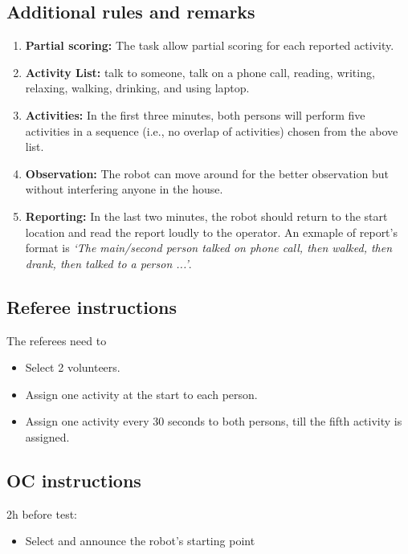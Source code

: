 \subsection{Additional rules and remarks}
\begin{enumerate}[nosep]
	\item \textbf{Partial scoring:} The task allow partial scoring for each reported activity.
	
	\item \textbf{Activity List:} talk to someone, talk on a phone call, reading, writing, relaxing, walking, drinking, and using laptop.
	
	\item \textbf{Activities:}  In the first three minutes, both persons will perform five activities in a sequence (i.e., no overlap of activities) chosen from the above list.
	
	\item \textbf{Observation:} The robot can move around for the better observation but without interfering anyone in the house.
	
	\item \textbf{Reporting:} In the last two minutes, the robot should return to the start location and read the report loudly to the operator. An exmaple of report's format is \textit{`The main/second person talked on phone call, then walked, then drank, then talked to a person ...'}.
	
\end{enumerate}


\subsection{Referee instructions}

The referees need to
\begin{itemize}
	\item Select 2 volunteers.
	\item Assign one activity at the start to each person.
	\item Assign one activity every 30 seconds to both persons, till the fifth activity is assigned.
\end{itemize}

\subsection{OC instructions}

2h before test:
\begin{itemize}
	\item Select and announce the robot's starting point
\end{itemize}

% 
